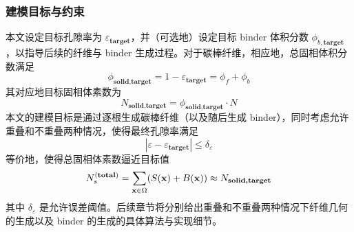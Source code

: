 \subsubsection{\textbf{建模目标与约束}}

本文设定目标孔隙率为 $\varepsilon_{\textbf{target}}$，并（可选地）设定目标 binder 体积分数 $\phi_{b,\textbf{target}}$，以指导后续的纤维与 binder 生成过程。对于碳棒纤维，相应地，总固相体积分数满足
\[
\phi_{\textbf{solid,target}} = 1 - \varepsilon_{\textbf{target}} = \phi_{f} + \phi_{b}
\]
其对应地目标固相体素数为
\[
N_{\textbf{solid,target}} = \phi_{\textbf{solid,target}} \cdot N
\]
本文的建模目标是通过逐根生成碳棒纤维（以及随后生成 binder），同时考虑允许重叠和不重叠两种情况，使得最终孔隙率满足
\[
|\varepsilon - \varepsilon_{\textbf{target}}| \le \delta_{\varepsilon}
\]
等价地，使得总固相体素数逼近目标值
\[
N_s^{(\textbf{total})} = \sum \limits_{\textbf{x} \in \Omega} (S(\textbf x) + B(\textbf x)) \approx N_{\textbf{solid,target}}
\]
其中 $\delta_{\varepsilon}$ 是允许误差阈值。后续章节将分别给出重叠和不重叠两种情况下纤维几何的生成以及 binder 的生成的具体算法与实现细节。